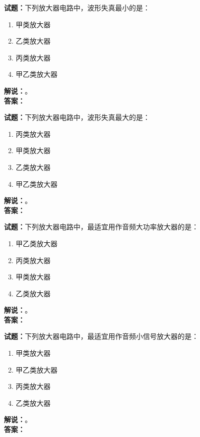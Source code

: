 \documentclass{ctexbook}
\begin{document}
\vspace{\baselineskip}

\noindent\textbf{试题：}下列放大器电路中，波形失真最小的是：
\begin{enumerate}[leftmargin=3em]
  \item 甲类放大器
  \item 乙类放大器
  \item 丙类放大器
  \item 甲乙类放大器
\end{enumerate}
\noindent\textbf{解说：}\textbf{}。\\\noindent\textbf{答案：}

\vspace{\baselineskip}

\noindent\textbf{试题：}下列放大器电路中，波形失真最大的是：
\begin{enumerate}[leftmargin=3em]
  \item 丙类放大器
  \item 甲类放大器
  \item 乙类放大器
  \item 甲乙类放大器
\end{enumerate}
\noindent\textbf{解说：}\textbf{}。\\\noindent\textbf{答案：}

\vspace{\baselineskip}

\noindent\textbf{试题：}下列放大器电路中，最适宜用作音频大功率放大器的是：
\begin{enumerate}[leftmargin=3em]
  \item 甲乙类放大器
  \item 丙类放大器
  \item 甲类放大器
  \item 乙类放大器
\end{enumerate}
\noindent\textbf{解说：}\textbf{}。\\\noindent\textbf{答案：}

\vspace{\baselineskip}

\noindent\textbf{试题：}下列放大器电路中，最适宜用作音频小信号放大器的是：
\begin{enumerate}[leftmargin=3em]
  \item 甲类放大器
  \item 甲乙类放大器
  \item 丙类放大器
  \item 乙类放大器
\end{enumerate}
\noindent\textbf{解说：}\textbf{}。\\\noindent\textbf{答案：}
\end{document}
